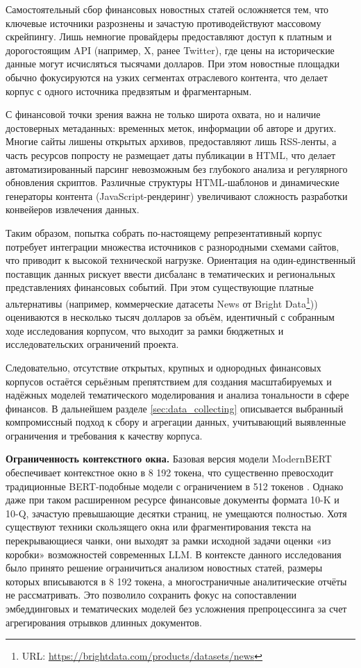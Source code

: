 Самостоятельный сбор финансовых новостных статей осложняется тем, что ключевые источники разрознены и зачастую
противодействуют массовому скрейпингу. Лишь немногие провайдеры предоставляют доступ к платным и дорогостоящим
API (например, X, ранее Twitter), где цены на исторические данные могут исчисляться тысячами долларов. При этом
новостные площадки обычно фокусируются на узких сегментах отраслевого контента, что делает корпус с одного
источника предвзятым и фрагментарным.

С финансовой точки зрения важна не только широта охвата, но и наличие достоверных метаданных: временных меток,
информации об авторе и других. Многие сайты лишены открытых архивов, предоставляют лишь RSS-ленты, а часть ресурсов
попросту не размещает даты публикации в HTML, что делает автоматизированный парсинг невозможным без глубокого
анализа и регулярного обновления скриптов. Различные структуры HTML-шаблонов и динамические генераторы контента
(JavaScript-рендеринг) увеличивают сложность разработки конвейеров извлечения данных.

Таким образом, попытка собрать по-настоящему репрезентативный корпус потребует интеграции множества источников
с разнородными схемами сайтов, что приводит к высокой технической нагрузке. Ориентация на один-единственный
поставщик данных рискует ввести дисбаланс в тематических и региональных представлениях финансовых событий. При
этом существующие платные альтернативы (например, коммерческие датасеты News от Bright
Data\footnote{URL: \url{https://brightdata.com/products/datasets/news}})) оцениваются в несколько тысяч долларов
за объём, идентичный с собранным ходе исследования корпусом, что выходит за рамки бюджетных и исследовательских
ограничений проекта.

Следовательно, отсутствие открытых, крупных и однородных финансовых корпусов остаётся серьёзным препятствием
для создания масштабируемых и надёжных моделей тематического моделирования и анализа тональности в сфере финансов.
В дальнейшем разделе \ref{sec:data_collecting} описывается выбранный компромиссный подход к сбору и агрегации
данных, учитывающий выявленные ограничения и требования к качеству корпуса.

\textbf{Ограниченность контекстного окна.} Базовая версия модели ModernBERT обеспечивает контекстное окно
в 8 192 токена, что существенно превосходит традиционные BERT-подобные модели с ограничением в 512 токенов
\parencite{devlin2019BERT,Warner2024ModernBERT}. Однако даже при таком расширенном ресурсе финансовые документы
формата 10-K и 10-Q, зачастую превышающие десятки страниц, не умещаются полностью. Хотя существуют техники
скользящего окна или фрагментирования текста на перекрывающиеся чанки, они выходят за рамки исходной задачи
оценки «из коробки» возможностей современных LLM. В контексте данного исследования было принято решение
ограничиться анализом новостных статей, размеры которых вписываются в 8 192 токена, а многостраничные аналитические
отчёты не рассматривать. Это позволило сохранить фокус на сопоставлении эмбеддинговых и тематических моделей
без усложнения препроцессинга за счет агрегирования отрывков длинных документов.

